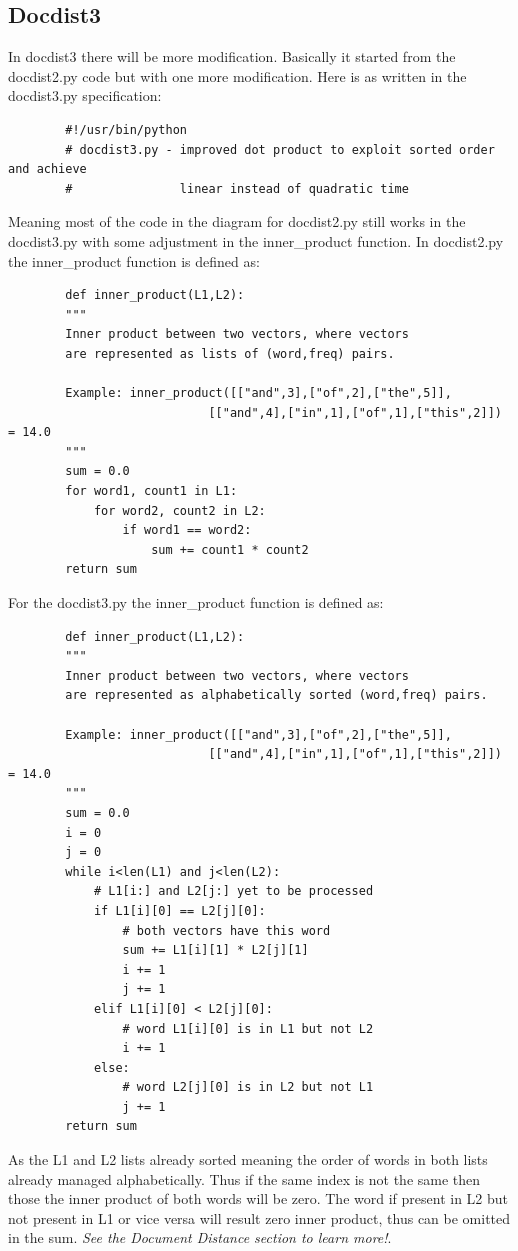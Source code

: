 \documentclass{article}
\begin{document}
    \subsection{Docdist3}
    In docdist3 there will be more modification. 
    Basically it started from the docdist2.py code but with one more modification.
    Here is as written in the docdist3.py specification:
    \begin{lstlisting}
        #!/usr/bin/python
        # docdist3.py - improved dot product to exploit sorted order and achieve
        #               linear instead of quadratic time
    \end{lstlisting}
    Meaning most of the code in the diagram for docdist2.py still works in the docdist3.py with some adjustment in the inner\_product function.
    In docdist2.py the inner\_product function is defined as:
    \begin{lstlisting}
        def inner_product(L1,L2):
        """
        Inner product between two vectors, where vectors
        are represented as lists of (word,freq) pairs.

        Example: inner_product([["and",3],["of",2],["the",5]],
                            [["and",4],["in",1],["of",1],["this",2]]) = 14.0 
        """
        sum = 0.0
        for word1, count1 in L1:
            for word2, count2 in L2:
                if word1 == word2:
                    sum += count1 * count2
        return sum
    \end{lstlisting}
    For the docdist3.py the inner\_product function is defined as:
    \begin{lstlisting}
        def inner_product(L1,L2):
        """
        Inner product between two vectors, where vectors
        are represented as alphabetically sorted (word,freq) pairs.

        Example: inner_product([["and",3],["of",2],["the",5]],
                            [["and",4],["in",1],["of",1],["this",2]]) = 14.0 
        """
        sum = 0.0
        i = 0
        j = 0
        while i<len(L1) and j<len(L2):
            # L1[i:] and L2[j:] yet to be processed
            if L1[i][0] == L2[j][0]:
                # both vectors have this word
                sum += L1[i][1] * L2[j][1]
                i += 1
                j += 1
            elif L1[i][0] < L2[j][0]:
                # word L1[i][0] is in L1 but not L2
                i += 1
            else:
                # word L2[j][0] is in L2 but not L1
                j += 1
        return sum
    \end{lstlisting}
    As the L1 and L2 lists already sorted meaning the order of words in both lists already managed alphabetically. 
    Thus if the same index is not the same then those the inner product of both words will be zero.
    The word if present in L2 but not present in L1 or vice versa will result zero inner product, thus can be omitted in the sum.
    \textit{See the Document Distance section to learn more!}.
\end{document}
